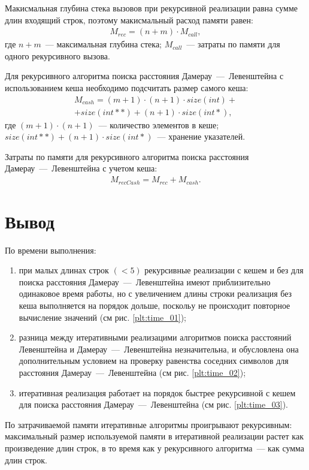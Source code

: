 Макисмальная глубина стека вызовов при рекурсивной реализации равна сумме длин входящий строк, поэтому макисмальный расход памяти равен:
\begin{equation}
	\begin{aligned}
		M_{rec} = (n + m) \cdot M_{call},
	\end{aligned}
\end{equation}
где $n + m$~--- максимальная глубина стека;
\newline $M_{call}$~--- затраты по памяти для одного рекурсивного вызова.

Для рекурсивного алгоритма поиска расстояния Дамерау~---~Левенштейна с использованием кеша необходимо подсчитать размер самого кеша:
\begin{multline}
	M_{cash} = (m + 1) \cdot (n + 1) \cdot size(int) + \\ + size(int **) + (n + 1) \cdot size(int *),
\end{multline}
где $(m + 1) \cdot (n + 1)$~--- количество элементов в кеше;
\newline $size(int **) + (n + 1) \cdot size(int *)$~--- хранение указателей.

Затраты по памяти для рекурсивного алгоритма поиска расстояния Дамерау~---~Левенштейна с учетом кеша: 
\begin{equation}
	\label{}
	\begin{aligned}
		M_{recCash} = M_{rec} + M_{cash}.
	\end{aligned}
\end{equation}

\section{Вывод}

По времени выполнения:
\begin{enumerate}
	\item при малых длинах строк $(< 5)$ рекурсивные реализации с кешем и без для поиска расстояния Дамерау~---~Левенштейна имеют приблизительно одинаковое время работы, 
	но с увеличением длины строки реализация без кеша выполняется на порядок дольше, поскольу не происходит повторное вычисление значений (см рис. \ref{plt:time_01});
	\item разница между итеративными реализацими алгоритмов поиска расстояний Левенштейна и Дамерау~---~Левенштейна незначительна, и обусловлена она
	дополнительным условием на проверку равенства соседних символов для расстояния Дамерау~---~Левенштейна (см рис. \ref{plt:time_02});
	\item итеративная реализация работает на порядок быстрее рекурсивной с кешем для поиска расстояния Дамерау~---~Левенштейна (см рис. \ref{plt:time_03}).
\end{enumerate}

По затрачиваемой памяти итеративные алгоритмы проигрывают рекурсивным: максимальный размер используемой памяти в итеративной реализации растет
как произведение длин строк, в то время как у рекурсивного алгоритма~--- как сумма длин строк.